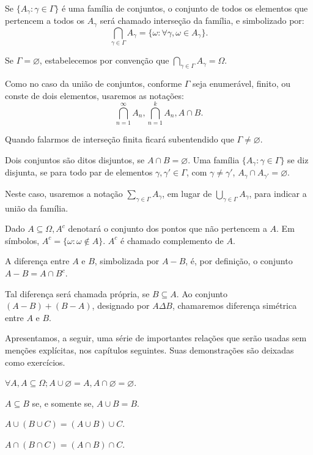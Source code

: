\documentclass[
]{book}
\begin{document}
Se \(\{A_{\gamma}: \gamma \in \Gamma\}\) é uma família de conjuntos, o conjunto de todos os elementos que pertencem a todos os \(A_{\gamma}\) será chamado interseção da família, e simbolizado por: \[ \bigcap_{\gamma \in \Gamma} A_{\gamma} = \{\omega: \forall \gamma, \omega \in A_{\gamma}\}. \]

Se \(\Gamma = \varnothing\), estabelecemos por convenção que \(\bigcap\limits_{\gamma \in \Gamma} A_{\gamma} = \Omega\).

Como no caso da união de conjuntos, conforme \(\Gamma\) seja enumerável, finito, ou conste de dois elementos, usaremos as notações: \[\bigcap\limits_{n=1}^{\infty} A_n, \bigcap\limits_{n=1}^{k} A_n, A \cap B.\]

Quando falarmos de interseção finita ficará subentendido que \(\Gamma \neq \varnothing\).

Dois conjuntos são ditos disjuntos, se \(A \cap B = \varnothing\).
Uma família \(\{A_{\gamma}: \gamma \in \Gamma\}\) se diz disjunta, se para todo par de elementos \(\gamma, \gamma' \in \Gamma\), com \(\gamma \neq \gamma'\), \(A_{\gamma} \cap A_{\gamma'} = \varnothing\).

Neste caso, usaremos a notação \(\sum\limits_{\gamma \in \Gamma} A_{\gamma}\), em lugar de \(\bigcup\limits_{\gamma \in \Gamma} A_{\gamma}\), para indicar a união da família.

Dado \(A \subseteq \Omega, A^c\) denotará o conjunto dos pontos que não pertencem a \(A\).
Em símbolos, \(A^c = \{\omega: \omega \notin A\}\).
\(A^c\) é chamado complemento de \(A\).

A diferença entre \(A\) e \(B\), simbolizada por \(A-B\), é, por definição, o conjunto \(A-B = A \cap B^c\).

Tal diferença será chamada própria, se \(B \subseteq A\).
Ao conjunto \((A-B) + (B-A)\), designado por \(A \Delta B\), chamaremos diferença simétrica entre \(A\) e \(B\).

Apresentamos, a seguir, uma série de importantes relações que serão usadas sem menções explícitas, nos capítulos seguintes.
Suas demonstrações são deixadas como exercícios.

\(\forall A, A \subseteq \Omega; A \cup \varnothing = A, A \cap \varnothing = \varnothing\).

\(A \subseteq B\) se, e somente se, \(A \cup B = B\).

\(A \cup (B \cup C) = (A \cup B) \cup C\).

\(A \cap (B \cap C) = (A \cap B) \cap C\).
\end{document}
